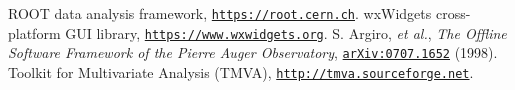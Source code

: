 \documentclass[12pt,a4paper]{report}
\begin{document}
%
%

\pagebreak
\begin{thebibliography}{50} 
\raggedright
{} ROOT data analysis framework, \href{https://root.cern.ch}{\texttt{https://root.cern.ch}}.
 wxWidgets cross-platform GUI library, \href{https://www.wxwidgets.org}{\texttt{https://www.wxwidgets.org}}.
 S. Argiro, \emph{et al.}, \emph{The Offline Software Framework of the Pierre Auger Observatory}, \href{http://arxiv.org/pdf/0707.1652v1.pdf}{\texttt{arXiv:0707.1652}} (1998).
 Toolkit for Multivariate Analysis (TMVA), \href{http://tmva.sourceforge.net}{\texttt{http://tmva.sourceforge.net}}.
\end{thebibliography}
\end{document}

